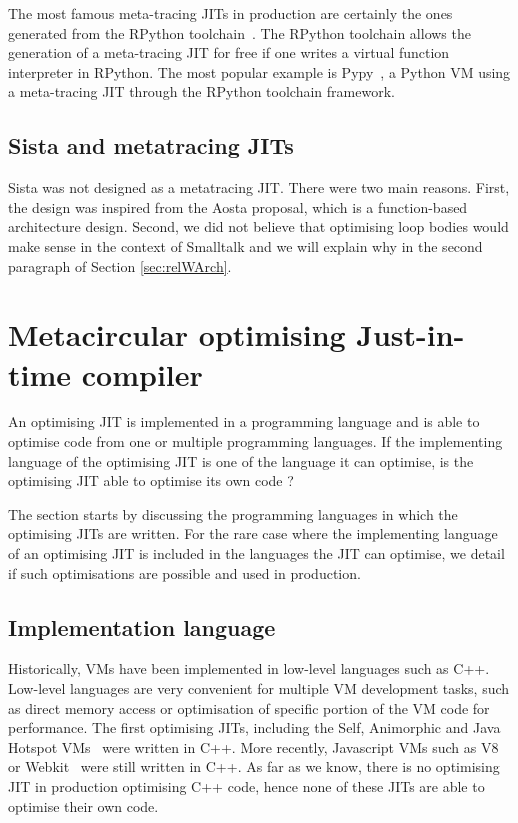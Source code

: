 \documentclass[a4paper,12pt,twoside]{../includes/ThesisStyle}
\begin{document}
The most famous meta-tracing JITs in production are certainly the ones generated from the RPython toolchain~\cite{Rigo06a}. The RPython toolchain allows the generation of a meta-tracing JIT for free if one writes a virtual function interpreter in RPython. The most popular example is Pypy~\cite{Rigo06a,PyPyTracing}, a Python VM using a meta-tracing JIT through the RPython toolchain framework.

\subsection{Sista and metatracing JITs}

Sista was not designed as a metatracing JIT. There were two main reasons. First, the design was inspired from the Aosta proposal, which is a function-based architecture design. Second, we did not believe that optimising loop bodies would make sense in the context of Smalltalk and we will explain why in the second paragraph of Section \ref{sec:relWArch}.


\section{Metacircular optimising Just-in-time compiler}
\label{sec:implLang}

An optimising JIT is implemented in a programming language and is able to optimise code from one or multiple programming languages. If the implementing language of the optimising JIT is one of the language it can optimise, is the optimising JIT able to optimise its own code ?

The section starts by discussing the programming languages in which the optimising JITs are written. For the rare case where the implementing language of an optimising JIT is included in the languages the JIT can optimise, we detail if such optimisations are possible and used in production.

\subsection{Implementation language}
Historically, VMs have been implemented in low-level languages such as C++. Low-level languages are very convenient for multiple VM development tasks, such as direct memory access or optimisation of specific portion of the VM code for performance. The first optimising JITs, including the Self, Animorphic and Java Hotspot VMs~\cite{UrsPHD,Sun06} were written in C++. More recently, Javascript VMs such as V8 or Webkit~\cite{Webkit15} were still written in C++. As far as we know, there is no optimising JIT in production optimising C++ code, hence none of these JITs are able to optimise their own code.
\end{document}
